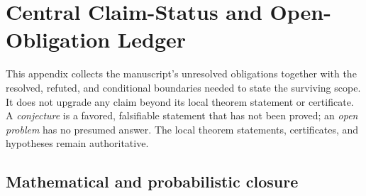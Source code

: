 \chapter{Central Claim-Status and Open-Obligation Ledger}
\label{app:claim-ledger}

This appendix collects the manuscript's unresolved obligations together with
the resolved, refuted, and conditional boundaries needed to state the surviving
scope.  It does not upgrade any claim beyond its local theorem statement or
certificate.  A \emph{conjecture} is a favored, falsifiable statement that has
not been proved; an \emph{open problem} has no presumed answer.  The local
theorem statements, certificates, and hypotheses remain authoritative.

\small

\section{Mathematical and probabilistic closure}

